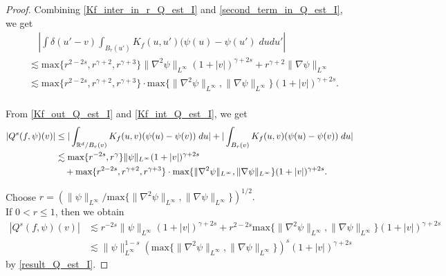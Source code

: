 \documentclass[reqno,10pt]{amsart}
\numberwithin{equation}{section}
\begin{document}
\begin{proof}
\noindent Combining \eqref{Kf_inter_in_r_Q_est_I}
and \eqref{second_term_in_Q_est_I}, we get 
\begin{equation} \label{Kf_int_Q_est_I}
\begin{split}
&\quad|\int \delta(u'-v)\int_{B_r(u')} K_f(u,u')(\psi(u)-\psi(u')\;dudu'| \\
& \lesssim \text{max}\{r^{2-2s}, r^{\gamma+2},  r^{\gamma+3}\}
 \|\nabla^2 \psi\|_{L^\infty}(1+|v|)^{\gamma+2s}+r^{\gamma+2}\|\nabla \psi\|_{L^\infty}  \\
&\lesssim  \text{max}\{r^{2-2s}, r^{\gamma+2},  r^{\gamma+3}\} \cdot \text{max}\{\|\nabla^2 \psi\|_{L^\infty}, \|\nabla \psi\|_{L^\infty} \}(1+|v|)^{\gamma+2s}.  \\
\end{split} 
\end{equation} \vspace{3mm}

\noindent From \eqref{Kf_out_Q_est_I} and \eqref{Kf_int_Q_est_I}, we get
\begin{align} 
    |Q^{s}(f,\psi)(v)| &\leq    |\int_{\mathbb{R}^d/B_r(v)} K_f(u,v)(\psi(u)-\psi(v)) \; du| +
    |\int_{B_r(v)} K_f(u,v)(\psi(u)-\psi(v))\;du| \notag  \\ 
    &\lesssim
    \text{max}\{r^{-2s}, r^{\gamma}\} \|\psi\|_{L^{\infty}}(1+|v|)^{\gamma+2s} \label{result_Q_est_I} \\
    &\quad +\text{max}\{r^{2-2s}, r^{\gamma+2},  r^{\gamma+3}\} \cdot \text{max}\{\|\nabla^2 \psi\|_{L^\infty}, \|\nabla \psi\|_{L^\infty} \}(1+|v|)^{\gamma+2s}. \notag
\end{align} \vspace{3mm}

\noindent Choose $r=(\|\psi\|_{L^{\infty}}/\text{max}\{\|\nabla^2 \psi\|_{L^\infty}, \|\nabla \psi\|_{L^\infty} \})^{1/2}.$\\
\noindent If $0<r\leq 1$, then we obtain 
\begin{align*}
     |Q^{s}(f,\psi)(v)| &\lesssim r^{-2s}\|\psi\|_{L^{\infty}}(1+|v|)^{\gamma+2s} + r^{2-2s}\text{max}\{\|\nabla^2 \psi\|_{L^\infty}, \|\nabla \psi\|_{L^\infty} \}(1+|v|)^{\gamma+2s}\\
     &\lesssim  \|\psi\|_{L^{\infty}}^{1-s}(\text{max}\{\|\nabla^2 \psi\|_{L^\infty}, \|\nabla \psi\|_{L^\infty} \})^{s}(1+|v|)^{\gamma+2s}
\end{align*} by \eqref{result_Q_est_I}.\vspace{3mm} 


\end{proof}
\end{document}
